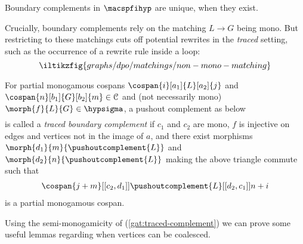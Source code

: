 \begin{proposition}\label{prop:boundary-complement-unique}
    Boundary complements in \(\macspfihyp\) are unique, when they exist.
\end{proposition}

\noindent
Crucially, boundary complements rely on the matching \(L \to G\) being mono.
But restricting to these matchings cuts off potential rewrites in the
\emph{traced} setting, such as the occurrence of a rewrite rule inside a loop:
\[
    \iltikzfig{graphs/dpo/matchings/non-mono-matching}
\]

\begin{definition}
    For partial monogamous cospans \(
        \cospan{i}[a_1]{L}[a_2]{j}
    \) and \(
        \cospan{n}[b_1]{G}[b_2]{m} \in \mathcal{C}
    \) and (not necessarily mono) \(
        \morph{f}{L}{G} \in \hypsigma
    \), a pushout complement as below
    \begin{gather}
        \label{gath:traced-boundary complement}
        
    \end{gather}
    is called a \emph{traced boundary complement} if \(c_1\) and \(c_2\) are
    mono, \(f\) is injective on edges and vertices not in the image of \(a\),
    and there exist morphisms \(
        \morph{d_1}{m}{\pushoutcomplement{L}}
    \) and \(
        \morph{d_2}{n}{\pushoutcomplement{L}}
    \) making the above triangle commute such that
    \begin{gather}
        \cospan{j+m}[[c_2,d_1]]{\pushoutcomplement{L}}[[d_2,c_1]]{{n+i}}
        \label{gat:traced-complement}
    \end{gather} is a partial monogamous cospan.
\end{definition}

\noindent
Using the semi-monogamicity of (\ref{gat:traced-complement}) we can prove some
useful lemmas regarding when vertices can be coalesced.

